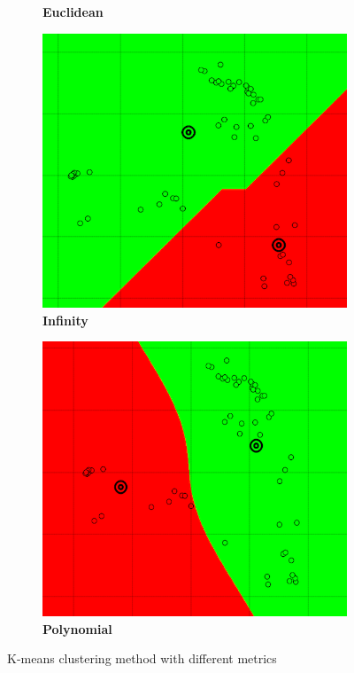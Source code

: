 \begin{figure} [ht]
\begin{subfigure}[h]{0.23\textwidth}
	\caption{\bf Euclidean}
    \end{subfigure}
    \begin{subfigure}[h]{0.23\textwidth}
    \centering
   \includegraphics[height=0.08\textheight]{./clustering/l0norm.png}
	\caption{\bf Infinity}
    \end{subfigure}
    \begin{subfigure}[h]{0.23\textwidth}
    \centering
    \includegraphics[height=0.08\textheight]{./clustering/lpnorm.png}
	\caption{\bf Polynomial}
    \end{subfigure}
\caption{K-means clustering method with different metrics}
\label{fig:figure4}
\end{figure}
